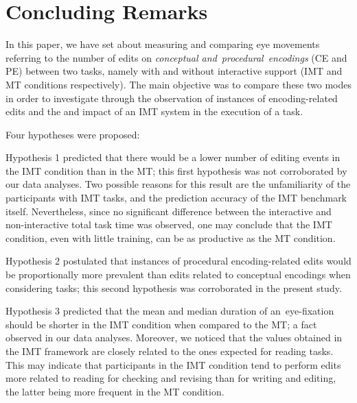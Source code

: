 \documentclass[output=paper]{langsci/langscibook}
\begin{document}
\section{Concluding Remarks\label{alves:sec:ConcludingRemarks}}


In this paper, we have set about measuring and comparing eye movements referring to the number of edits on \emph{conceptual and}{~}\emph{procedural}{~}\emph{encodings }(CE and PE) between two  tasks, namely with and without interactive support (IMT and MT conditions respectively). The main objective was to compare these two modes in order to investigate  through the observation of instances of encoding-related edits and the  and impact of an IMT system in the execution of a  task. 



Four hypotheses were proposed: 



Hypothesis 1 predicted that there would be a lower number of editing events in the IMT condition than in the MT; this first hypothesis was not corroborated by our data analyses. Two possible reasons for this result are the unfamiliarity of the participants with IMT  tasks, and the prediction accuracy of the IMT benchmark itself. Nevertheless, since no significant difference between the interactive and non-interactive total task time was observed, one may conclude that the IMT condition, even with little training, can be as productive as the MT condition. 


\newpage 

Hypothesis 2 postulated that instances of procedural encoding-related edits would be proportionally more prevalent than edits related to conceptual encodings when considering  tasks; this second hypothesis was corroborated in the present study. 



Hypothesis 3 predicted that the mean and median duration of an~eye-fixation should be shorter in the IMT condition when compared to the MT; a fact observed in our data analyses. Moreover, we noticed that the values obtained in the IMT framework are closely related to the ones expected for reading tasks. This may indicate that participants in the IMT condition tend to perform edits more related to reading for checking and revising than for writing and editing, the latter being more frequent in the MT condition.~
\end{document}
